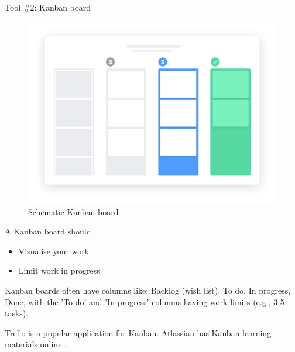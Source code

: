 \documentclass[aspectratio=1610, 11pt]{beamer} %
\begin{document}
 \begin{frame}{Tool \#2: Kanban board}
  \begin{figure}[Kanban]
     \centering
         \includegraphics[height=.75\textheight]{figures/kanban.png}
         \caption{Schematic Kanban board \cite{Atlassian2019-bo}}
         \label{fig:9}
  \end{figure}
 \end{frame}

 \begin{frame}{A Kanban board should}
     \begin{itemize}[label=\textbullet]
         \item Visualise your work
         \item Limit work in progress
     \end{itemize}
 Kanban boards often have columns like: Backlog (wish list), To do, In progress, Done, with the 'To do' and 'In progress' columns having work limits (e.g., 3-5 tasks). 

 Trello is a popular application for Kanban. Atlassian has Kanban learning materials online \cite{Atlassian2019-bo}.
 \end{frame}


\end{document}
